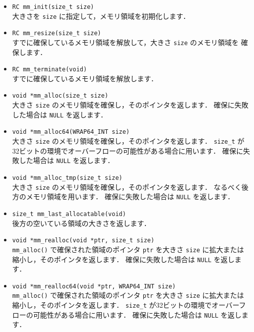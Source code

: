 \begin{itemize}
\item \verb|RC mm_init(size_t size)| \ \\
大きさを \verb|size| に指定して，メモリ領域を初期化します．

\item \verb|RC mm_resize(size_t size)| \ \\
すでに確保しているメモリ領域を解放して，大きさ \verb|size| のメモリ領域を
確保します．

\item \verb|RC mm_terminate(void)| \ \\
すでに確保しているメモリ領域を解放します．

\item \verb|void *mm_alloc(size_t size)| \ \\
大きさ \verb|size| のメモリ領域を確保し，そのポインタを返します．
確保に失敗した場合は \verb|NULL| を返します．

\item \verb|void *mm_alloc64(WRAP64_INT size)| \ \\
大きさ \verb|size| のメモリ領域を確保し，そのポインタを返します．
\verb|size_t| が32ビットの環境でオーバーフローの可能性がある場合に用います．
確保に失敗した場合は \verb|NULL| を返します．

\item \verb|void *mm_alloc_tmp(size_t size)| \ \\
大きさ \verb|size| のメモリ領域を確保し，そのポインタを返します．
なるべく後方のメモリ領域を用います．
確保に失敗した場合は \verb|NULL| を返します．

\item \verb|size_t mm_last_allocatable(void)| \ \\
後方の空いている領域の大きさを返します．

\item \verb|void *mm_realloc(void *ptr, size_t size)| \ \\
\verb|mm_alloc()| で確保された領域のポインタ \verb|ptr| を大きさ 
\verb|size| に拡大または縮小し，そのポインタを返します．
確保に失敗した場合は \verb|NULL| を返します．

\item \verb|void *mm_realloc64(void *ptr, WRAP64_INT size)| \ \\
\verb|mm_alloc()| で確保された領域のポインタ \verb|ptr| を大きさ 
\verb|size| に拡大または縮小し，そのポインタを返します．
\verb|size_t| が32ビットの環境でオーバーフローの可能性がある場合に用います．
確保に失敗した場合は \verb|NULL| を返します．


\end{itemize}

